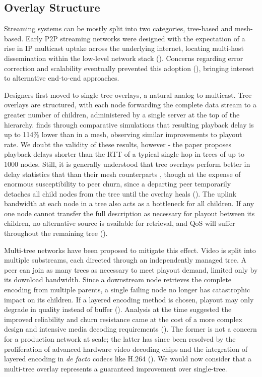 \documentclass[12pt,a4paper]{article}
\begin{document}
\subsection{Overlay Structure} \label{litreview:structure}
Streaming systems can be mostly split into two categories, tree-based and mesh-based. Early P2P streaming networks were designed with the expectation of a rise in IP multicast uptake across the underlying internet, locating multi-host dissemination within the low-level network stack (\cite{Deering1989}). Concerns regarding error correction and scalability eventually prevented this adoption (\cite{Chu2002}), bringing interest to alternative end-to-end approaches.

Designers first moved to single tree overlays, a natural analog to multicast. Tree overlays are structured, with each node forwarding the complete data stream to a greater number of children, administered by a single server at the top of the hierarchy. \cite{Goh2013} finds through comparative simulations that resulting playback delay is up to 114\% lower than in a mesh, observing similar improvements to playout rate. We doubt the validity of these results, however - the paper proposes playback delays shorter than the RTT of a typical single hop in trees of up to 1000 nodes. Still, it is generally understood that tree overlays perform better in delay statistics that than their mesh counterparts \cite{Awiphan2010}, though at the expense of enormous susceptibility to peer churn, since a departing peer temporarily detaches all child nodes from the tree until the overlay heals (\cite{Ghoshal2007}). The uplink bandwidth at each node in a tree also acts as a bottleneck for all children. If any one node cannot transfer the full description as necessary for playout between its children, no alternative source is available for retrieval, and QoS will suffer throughout the remaining tree (\cite{Magharei2007}).

Multi-tree networks have been proposed to mitigate this effect. Video is split into multiple substreams, each directed through an independently managed tree. A peer can join as many trees as necessary to meet playout demand, limited only by its download bandwidth. Since a downstream node retrieves the complete encoding from multiple parents, a single failing node no longer has catastrophic impact on its children. If a layered encoding method is chosen, playout may only degrade in quality instead of buffer (\cite{Zink2004}). Analysis at the time suggested the improved reliability and churn resistance came at the cost of a more complex design and intensive media decoding requirements (\cite{Ghoshal2007}). The former is not a concern for a production network at scale; the latter has since been resolved by the proliferation of advanced hardware video decoding chips and the integration of layered encoding in \textit{de facto} codecs like H.264 (\cite{Seeling2012}). We would now consider that a multi-tree overlay represents a guaranteed improvement over single-tree.
\end{document}
